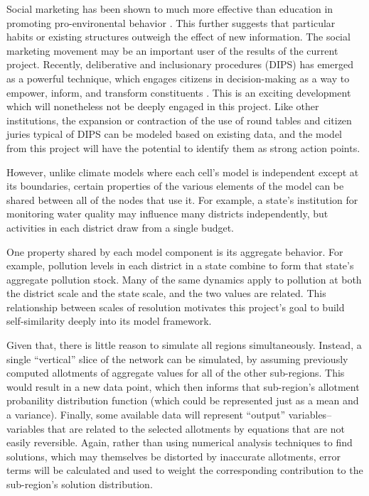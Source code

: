 Social marketing has been shown to much more effective than education in promoting pro-environental behavior \citep{mckenzie1999fostering}.  This further suggests that particular habits or existing structures outweigh the effect of new information.  The social marketing movement may be an important user of the results of the current project.  Recently, deliberative and inclusionary procedures (DIPS) has emerged as a powerful technique, which engages citizens in decision-making as a way to empower, inform, and transform constituents \citep{bloomfield1998deliberative}.  This is an exciting development which will nonetheless not be deeply engaged in this project.  Like other institutions, the expansion or contraction of the use of round tables and citizen juries typical of DIPS can be modeled based on existing data, and the model from this project will have the potential to identify them as strong action points.

However, unlike climate models where each cell's model is independent except at its boundaries, certain properties of the various elements of the model can be shared between all of the nodes that use it.  For example, a state's institution for monitoring water quality may influence many districts independently, but activities in each district draw from a single budget.

One property shared by each model component is its aggregate behavior.  For example, pollution levels in each district in a state combine to form that state's aggregate pollution stock.  Many of the same dynamics apply to pollution at both the district scale and the state scale, and the two values are related.  This relationship between scales of resolution motivates this project's goal to build self-similarity deeply into its model framework.  

Given that, there is little reason to simulate all regions simultaneously.  Instead, a single ``vertical'' slice of the network can be simulated, by assuming previously computed allotments of aggregate values for all of the other sub-regions.  This would result in a new data point, which then informs that sub-region's allotment probanility distribution function (which could be represented just as a mean and a variance).  Finally, some available data will represent ``output'' variables-- variables that are related to the selected allotments by equations that are not easily reversible.  Again, rather than using numerical analysis techniques to find solutions, which may themselves be distorted by inaccurate allotments, error terms will be calculated and used to weight the corresponding contribution to the sub-region's solution distribution.


